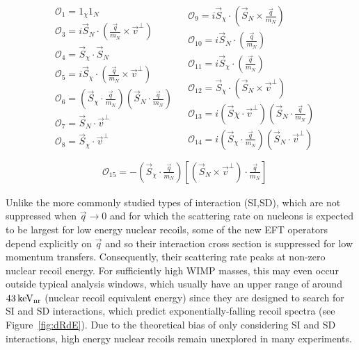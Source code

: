 \begingroup
\belowdisplayskip=0pt
\begin{align*}
\begin{split} 
&\mathcal{O}_1 = 1_{\chi} 1_N  \\
&\mathcal{O}_3 = i\vec{S}_N\cdot (\frac{\vec{q}}{m_N}\times\vec{v}^\perp) \\
&\mathcal{O}_4 = \vec{S}_{\chi}\cdot \vec{S}_N \\
&\mathcal{O}_5 = i\vec{S}_{\chi}\cdot (\frac{\vec{q}}{m_N}\times\vec{v}^\perp) \\
&\mathcal{O}_6 = (\vec{S}_{\chi} \cdot \frac{\vec{q}}{m_N})(\vec{S}_N \cdot \frac{\vec{q}}{m_N}) \\
&\mathcal{O}_7 = \vec{S}_N \cdot \vec{v}^\perp \\
&\mathcal{O}_8 = \vec{S}_{\chi} \cdot \vec{v}^\perp  \\
\end{split}
\begin{split}
&\mathcal{O}_9 = i\vec{S}_{\chi} \cdot(\vec{S}_N \times \frac{\vec{q}}{m_N}) \\
&\mathcal{O}_{10} = i\vec{S}_N \cdot (\frac{\vec{q}}{m_N}) \\
&\mathcal{O}_{11} = i\vec{S}_{\chi} \cdot (\frac{\vec{q}}{m_N}) \\
&\mathcal{O}_{12} = \vec{S}_\chi \cdot (\vec{S}_N \times \vec{v}^\perp) \\
&\mathcal{O}_{13} = i(\vec{S}\chi \cdot \vec{v}^\perp)(\vec{S}_N \cdot \frac{\vec{q}}{m_N})\\
&\mathcal{O}_{14} = i(\vec{S}_\chi \cdot \frac{\vec{q}}{m_N})(\vec{S}_N \cdot \vec{v}^\perp) \\
\end{split}
\end{align*}
\endgroup
\begingroup
\abovedisplayskip=0pt
\begin{align}
&\mathcal{O}_{15} = -(\vec{S}_\chi \cdot \frac{\vec{q}}{m_N})\left[(\vec{S}_N \times \vec{v}^\perp)\cdot \frac{\vec{q}}{m_N}\right]
\label{eq:OpDef}
\end{align}
\endgroup

Unlike the more commonly studied types of interaction (SI,SD), which are not suppressed when $\vec{q} \rightarrow 0$ and for which the scattering rate on nucleons is expected to be largest for low energy nuclear recoils, some of the new EFT operators depend explicitly on $\vec{q}$ and so their interaction cross section is suppressed for low momentum transfers. Consequently, their scattering rate peaks at non-zero nuclear recoil energy. For sufficiently high WIMP masses, this may even occur outside typical analysis windows, which usually have an upper range of around $ 43\,\mathrm{keV_\mathrm{nr}}$ (nuclear recoil equivalent
energy) since they are designed to search for SI and SD interactions, which predict exponentially-falling recoil spectra (see Figure~\ref{fig:dRdE}). Due to the theoretical bias of only considering SI and SD interactions, high energy nuclear recoils remain unexplored in many experiments.

